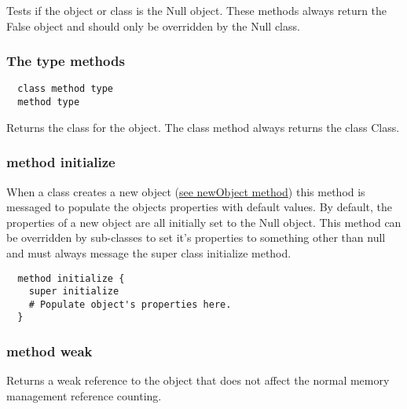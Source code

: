 Tests if the object or class is the Null object. These methods always return the False object and should only be overridden by the Null class.

\hfill
\subsubsection {The type methods}
\begin{lstlisting}
  class method type
  method type
\end{lstlisting}

Returns the class for the object. The class method always returns the class Class.

\hfill
\subsubsection {method initialize}
When a class creates a new object
(\hyperref[sec:class_method_newobject]{see newObject method}) this method is messaged to populate the objects properties with default values. By default, the properties of a new object are all initially set to the Null object. This method can be overridden by sub-classes to set it's properties to something other than null and must always message the super class initialize method.

\begin{lstlisting}
  method initialize {
    super initialize
    # Populate object's properties here.
  }
\end{lstlisting}

\subsubsection {method weak}

Returns a weak reference to the object that does not affect the normal memory management reference counting.
